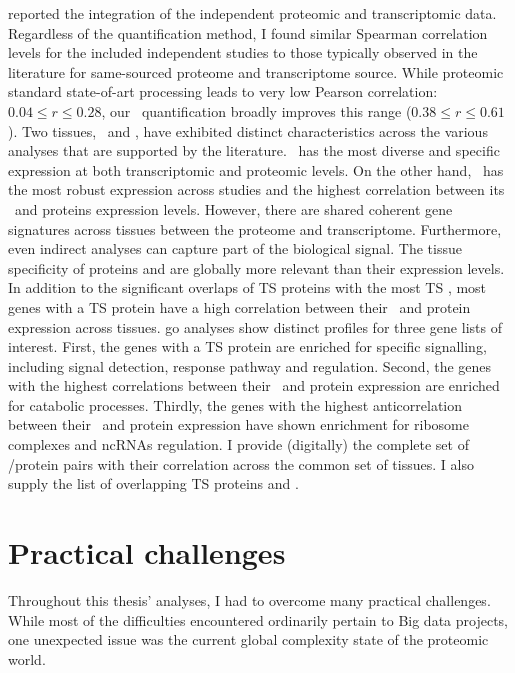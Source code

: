  reported
the integration of the independent proteomic and transcriptomic data.
Regardless of the quantification method,
I found similar Spearman correlation levels
for the included independent studies
to those typically observed in the literature
for same-sourced proteome and transcriptome source.
While proteomic standard state-of-art processing leads
to very low Pearson correlation: $0.04 ≤ r ≤ 0.28$,
our \PPKM\ quantification broadly improves this range ($0.38 ≤ r ≤ 0.61$).
Two tissues, \Testis\ and \Liver,
have exhibited distinct characteristics across the various analyses
that are supported by the literature.
\Testis\ has the most diverse and specific expression
at both transcriptomic and proteomic levels.
On the other hand, \Liver\ has the most robust expression across studies
and the highest correlation between its \mRNAs\ and proteins expression levels.
However, there are shared coherent gene signatures across tissues
between the proteome and transcriptome.
Furthermore, even indirect analyses can capture part of the biological signal.
The tissue specificity of proteins and \mRNAs{} are globally more relevant
than their expression levels.
In addition to the significant overlaps of \gls{TS} proteins
with the most \gls{TS} \mRNAs,
most genes with a \gls{TS} protein have
a high correlation between their \mRNA\ and protein expression across tissues.
\gls{go} analyses show distinct profiles for three gene lists of interest.
First, the genes with a \gls{TS} protein
are enriched for specific signalling,
including signal detection, response pathway and regulation.
Second, the genes with the highest correlations
between their \mRNA\ and protein expression
are enriched for catabolic processes.
Thirdly, the genes with the highest anticorrelation
between their \mRNA\ and protein expression
have shown enrichment for ribosome complexes and \glspl{ncRNA} regulation.
I provide (digitally) the complete set of \mRNA/protein pairs with their correlation
across the common set of tissues.
I also supply the list of overlapping \gls{TS} proteins and \mRNAs{}.\mybr\

\section*{Practical challenges}
Throughout this thesis' analyses,
I had to overcome many practical challenges.
While most of the difficulties encountered ordinarily pertain to Big data projects,
one unexpected issue was
the current global complexity state of the proteomic world.\mybr\

